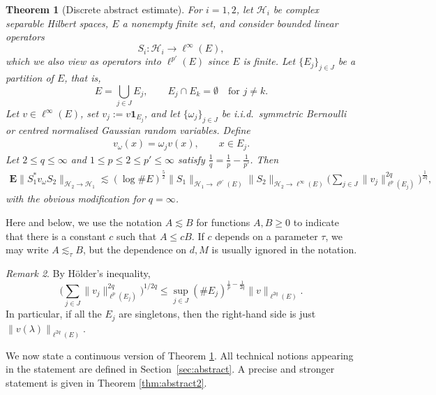 \documentclass[12pt,reqno]{amsart}
\newtheorem{theorem}{Theorem}[section]
\theoremstyle{definition}
\theoremstyle{remark}
\newtheorem{remark}[theorem]{Remark}
\numberwithin{equation}{section}
\newcommand{\1}{\mathbbm{1}}
\begin{document}
\begin{theorem}[Discrete abstract estimate]\label{thm:abstract1_intro}
For $i=1,2$, let $\mathcal{H}_i$ be complex separable Hilbert spaces, $E$ a nonempty finite set, and consider bounded linear operators
\[
S_i:\mathcal H_i\to \ell^\infty(E),
\]
which we also view as operators into $\ell^{p'}(E)$ since $E$ is finite.
Let $\{E_j\}_{j\in J}$ be a partition of $E$, that is,
\[
E=\bigcup_{j\in J}E_j,
\qquad
E_j\cap E_k=\emptyset \quad \text{for } j\neq k.
\]
Let $v\in \ell^\infty(E)$, set $v_j:=v\mathbf{1}_{E_j}$, and let $\{\omega_j\}_{j\in J}$ be i.i.d.~symmetric Bernoulli or centred normalised Gaussian random variables. Define
\begin{align}\label{def:v_omega discrte}
v_{\omega}(x)=\omega_j v(x),
\qquad x\in E_j.
\end{align}
Let $2\leq q\leq\infty$ and $1\leq p\leq 2\leq p'\leq \infty$ satisfy $\frac{1}{q}=\frac{1}{p}-\frac{1}{p'}$. Then
\begin{align}\label{eq:abstract1}
\!\!
\mathbf{E}\|S_1^*v_{\omega}S_2\|_{\mathcal{H}_2\to \mathcal{H}_1}
\lesssim
(\log \#E)^{\frac{5}{2}}
\|S_1\|_{\mathcal{H}_1\to \ell^{p'}(E)}
\|S_2\|_{\mathcal{H}_2\to \ell^\infty(E)}
\Big(\sum_{j\in J}\|v_j\|_{\ell^p(E_j)}^{2q}\Big)^{\frac{1}{2q}},
\end{align}
with the obvious modification for $q=\infty$.
\end{theorem}

Here and below, we use the notation $A \lesssim B$ for functions $A,B\geq0$ to indicate that there is a constant $c$ such that $A\leq c B$. If $c$ depends on a parameter $\tau$, we may write $A\lesssim_\tau B$, but the dependence on $d,M$ is usually ignored in the notation.

\begin{remark}\label{rem:Holder}
By H\"older's inequality,
\[
\Big(\sum_{j\in J}\|v_j\|_{\ell^p(E_j)}^{2q}\Big)^{1/2q}
\leq
\sup_{j\in J}(\# E_j)^{\frac{1}{p}-\frac{1}{2q}}\|v\|_{\ell^{2q}(E)}.
\]
In particular, if all the $E_j$ are singletons, then the right-hand side is just $\|v(\lambda)\|_{\ell^{2q}(E)}$.
\end{remark}



We now state a continuous version of Theorem \ref{thm:abstract1_intro}. All technical notions appearing in the statement are defined in Section~\ref{sec:abstract}. A precise and stronger statement is given in Theorem \ref{thm:abstract2}.
\end{document}
